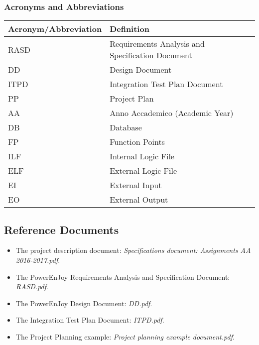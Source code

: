 \subsubsection{Acronyms and Abbreviations}
\begin{center}
	\begin{tabular} { | m{5cm} | m{8cm} | }
		\hline
		\textbf{Acronym/Abbreviation} & \textbf{Definition}\\
		\hline
		RASD & Requirements Analysis and Specification Document\\
		\hline
		DD & Design Document\\
		\hline
		ITPD & Integration Test Plan Document\\
		\hline
		PP & Project Plan\\
		\hline
		AA & Anno Accademico (Academic Year)\\
		\hline
		DB & Database\\
		\hline
		FP & Function Points\\
		\hline
		ILF & Internal Logic File\\
		\hline
		ELF & External Logic File\\
		\hline
		EI & External Input\\
		\hline
		EO & External Output\\
		\hline
	\end{tabular}
\end{center}

\subsection{Reference Documents}
\begin{itemize}
	\item The project description document: \textit{Specifications document: Assignments AA 2016-2017.pdf}.
	\item The PowerEnJoy Requirements Analysis and Specification Document: \textit{RASD.pdf}.
	\item The PowerEnJoy Design Document: \textit{DD.pdf}.
	\item The Integration Test Plan Document: \textit{ITPD.pdf}.
	\item The Project Planning example: \textit{Project planning example document.pdf}.
\end{itemize}